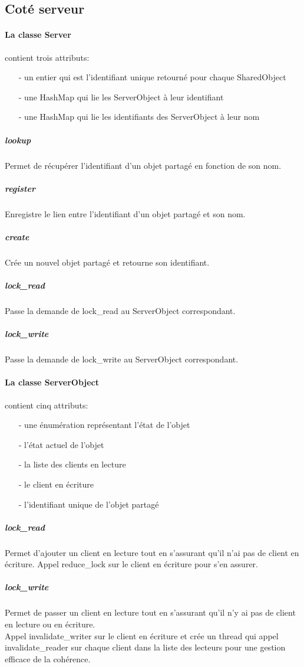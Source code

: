 \documentclass[a4paper,12pt]{article}
\begin{document}
\subsection{Coté serveur}

\bigskip

\paragraph{La classe Server}

contient trois attributs:
\begin{itemize}
\item[- un entier qui est l'identifiant unique retourné pour chaque SharedObject]
\item[- une HashMap qui lie les ServerObject à leur identifiant]
\item[- une HashMap qui lie les identifiants des ServerObject à leur nom]
\end{itemize}

\smallskip
\subparagraph{lookup}
Permet de récupérer l'identifiant d'un objet partagé en fonction de son nom.
\subparagraph{register}
Enregistre le lien entre l'identifiant d'un objet partagé et son nom.
\subparagraph{create}
Crée un nouvel objet partagé et retourne son identifiant.
\subparagraph{lock\_read}
Passe la demande de lock\_read au ServerObject correspondant.
\subparagraph{lock\_write}
Passe la demande de lock\_write au ServerObject correspondant.

\bigskip
\bigskip

\paragraph{La classe ServerObject}

 contient cinq attributs:
\begin{itemize}
\item[- une énumération représentant l'état de l'objet]
\item[- l'état actuel de l'objet]
\item[- la liste des clients en lecture]
\item[- le client en écriture]
\item[- l'identifiant unique de l'objet partagé]
\end{itemize}

\smallskip
\subparagraph{lock\_read}
Permet d'ajouter un client en lecture tout en s'assurant qu'il n'ai pas de client en écriture. Appel reduce\_lock sur le client en écriture pour s'en assurer.
\subparagraph{lock\_write}
Permet de passer un client en lecture tout en s'assurant qu'il n'y ai pas de client en lecture ou en écriture.\\
Appel invalidate\_writer sur le client en écriture et crée un thread qui appel invalidate\_reader sur chaque client dans la liste des lecteurs pour une gestion efficace de la cohérence.
\end{document}
